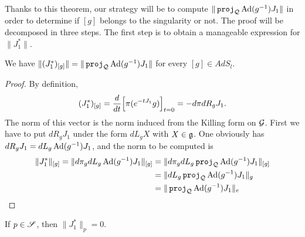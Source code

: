 Thanks to this theorem, our strategy will be to compute $\| \operatorname{\texttt{proj}}_{\mathcal{Q}}\operatorname{Ad}(g^{-1})J_1 \|$ in order to determine if $[g]$ belongs to the singularity or not. The proof will be decomposed in three steps. The first step is to obtain a manageable expression for $\| J_1^* \|$.

\begin{lemma}		\label{LONGLemExpressionCoolNormJUn}
	We have $\| (J_1^*)_{[g]} \|=\| \operatorname{\texttt{proj}}_{\mathcal{Q}}\operatorname{Ad}(g^{-1})J_1 \|$ for every $[g]\in AdS_l$.
\end{lemma}




\begin{proof}
	By definition, 
	\begin{equation}
		(J_1^*)_{[g]}=\frac{d}{dt}\Big[ \pi( e^{-tJ_1}g) \Big]_{t=0}=-d\pi dR_g J_1.
	\end{equation}
	The norm of this vector is the norm induced from the Killing form on $\mathcal{G}$\cite{Kerin}. First we have to put $dR_g J_1$ under the form $dL_g X$ with $X\in \mathfrak{g}$. One obviously has $dR_g J_1=dL_g\operatorname{Ad}(g^{-1})J_1$, and the norm to be computed is
	\begin{equation}
		\begin{aligned}[]
			\| J_1^* \|_{[g]}=\| d\pi_gdL_g\Ad(g^{-1})J_1\|_{[g]}&=  \|  d\pi_gdL_g\pr_{\sQ}\Ad(g^{-1})J_1\|_{[g]}\\ 
			&= \| dL_g\pr_{\sQ}\Ad(g^{-1})J_1 \|_{g} \\
			&=\| \pr_{\sQ}\Ad(g^{-1})J_1 \|_e
		\end{aligned}
	\end{equation}
\end{proof}


\begin{proposition}		\label{LONGPropPtpsSjzero}
	If $p\in\mathscr{S}$, then $\| J_1^* \|_p=0$.
\end{proposition}


